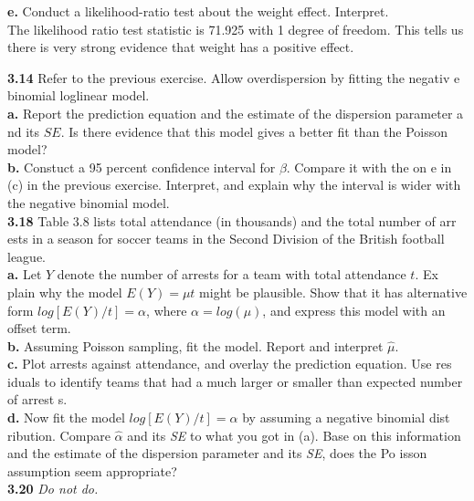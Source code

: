 \documentclass[paper=letter, fontsize=11pt]{scrartcl} %
\begin{document}
\textbf{e.} Conduct a likelihood-ratio test about the weight effect. Interpret. \\

The likelihood ratio test statistic is 71.925 with 1 degree of freedom. This tells us 
there is very strong evidence that weight has a positive effect. 

\textbf{3.14} Refer to the previous exercise. Allow overdispersion by fitting the negativ
e binomial loglinear model. \\
\textbf{a.} Report the prediction equation and the estimate of the dispersion parameter a
nd its $SE$. Is there evidence that this model gives a better fit than the Poisson model?
\\




\textbf{b.} Constuct a 95 percent confidence interval for $\beta$. Compare it with the on
e in (c) in the previous exercise. Interpret, and explain why the interval is wider with 
the negative binomial model. \\





\textbf{3.18} Table 3.8 lists total attendance (in thousands) and the total number of arr
ests in a season for soccer teams in the Second Division of the British football league.
\\
\textbf{a.} Let $Y$ denote the number of arrests for a team with total attendance $t$. Ex
plain why the model $E(Y) = \mu t$ might be plausible. Show that it has alternative form 
$log[E(Y)/t] = \alpha$, where $\alpha = log(\mu)$, and express this model with an offset 
term. \\
\textbf{b.} Assuming Poisson sampling, fit the model. Report and interpret $\hat{\mu}$.\\
\textbf{c.} Plot arrests against attendance, and overlay the prediction equation. Use res
iduals to identify teams that had a much larger or smaller than expected number of arrest
s. \\
\textbf{d.} Now fit the model $log[E(Y)/t] = \alpha$ by assuming a negative binomial dist
ribution. Compare $\hat{\alpha}$ and its \textit{SE} to what you got in (a). Base on this 
information and the estimate of the dispersion parameter and its \textit{SE}, does the Po
isson assumption seem appropriate? \\

\textbf{3.20} \textit{Do not do.}
\end{document}
